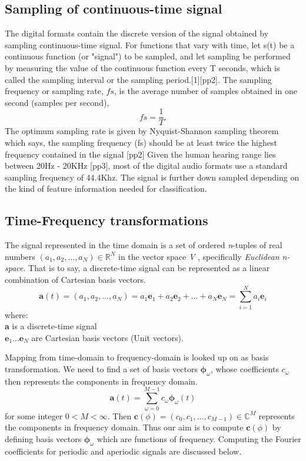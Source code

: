 \subsection{Sampling of continuous-time signal}
\label{sampling}
The digital formats contain the discrete version of the signal obtained by sampling continuous-time signal. For functions that vary with time, let s(t) be a continuous function (or "signal") to be sampled, and let sampling be performed by measuring the value of the continuous function every T seconds, which is called the sampling interval or the sampling period.[1][pp2]. The sampling frequency or sampling rate, $fs$, is the average number of samples obtained in one second (samples per second),  
\[
 fs = \frac{1}{T}.
\]
The optimum sampling rate is given by Nyquist-Shannon sampling theorem which says, the sampling frequency (fs) should be at least twice the highest frequency contained in the signal [pp2] Given the human hearing range lies between 20Hz - 20KHz [pp3], most of the digital audio formats use a standard sampling frequency of 44.4Khz. The signal is further down sampled depending on the kind of feature information needed for classification. 


\subsection{Time-Frequency transformations}
\label{time}
The signal represented in the time domain is a set of ordered \textit{n}-tuples of real numbers \( (a_{1},a_{2}, ...,a_{N}) \in \mathbb{R}^N \) in the vector space \textit{V} , specifically \textit{Euclidean n-space}. That is to say, a discrete-time signal can be represented as a \gls{linear combination} of Cartesian \gls{basis} vectors. 
\begin{equation}
\textbf{a}(t) = (a_{1},a_{2}, ...,a_{N}) = a_{1}\textbf{e}_{1} + a_{2}\textbf{e}_{2} + ... + a_{N}\textbf{e}_{N} = \displaystyle\sum_{i=1}^{N}a_{i}\textbf{e}_{i}
\end{equation} 
where:\\
\indent \textbf{a} is a discrete-time signal\\
\indent $\textbf{e}_{1} ... \textbf{e}_{N}$ are Cartesian basis vectors (Unit vectors).
\bigskip

\noindent Mapping from time-domain to frequency-domain is looked up on as \gls{basis transformation}. We need to find a set of basis vectors $\bm{\phi}_{ \omega }$, whose coefficients $c_{ \omega }$ then represents the components in frequency domain. 
\begin{equation}
\textbf{a}(t) = \displaystyle\sum_{ \omega =0}^{M-1}c_{ \omega }\bm{\phi}_{ \omega }(t) 
\end{equation}
for some integer $0 < M < \infty$. Then $\textbf{c}(\phi) = (c_{0},c_{1}, ...,c_{M-1}) \in \mathbb{C}^M $ represents the components in frequency domain. Thus our aim is to compute $\textbf{c}(\phi)$ by defining basis vectors $\bm{\phi}_{\omega}$ which are functions of frequency. Computing the Fourier coefficients for periodic and aperiodic signals are discussed below.


